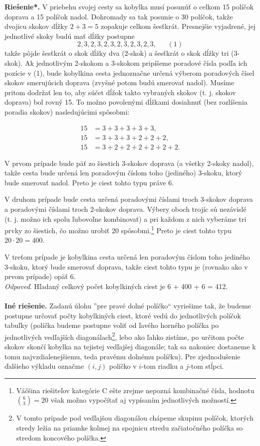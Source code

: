 \documentclass[11pt,a4paper,oneside,final]{book}
\newcommand{\rieh}{\textbf{Riešenie*.} }
\begin{document}
\rieh V priebehu svojej cesty sa kobylka musí posunúť o celkom 15 políčok doprava a 15 políčok nadol. Dohromady sa tak posunie o 30 políčok, takže dvojicu skokov dĺžky $2+3 = 5$ zopakuje celkom šesťkrát. Presnejšie vyjadrené, jej jednotlivé skoky budú mať
dĺžky postupne
$$ 2, 3, 2, 3, 2, 3, 2, 3, 2, 3, 2, 3, \ \ \ \ \ \ \ (1)$$
takže pôjde šesťkrát o skok dĺžky dva (2-skok) a šesťkrát o skok dĺžky tri (3-skok). Ak jednotlivým 2-skokom a 3-skokom pripíšeme poradové čísla podľa ich pozície v (1), bude kobylkina cesta jednoznačne určená výberom poradových čísel skokov smerujúcich doprava (zvyšné potom budú smerovať nadol). Musíme pritom dodržať len to, aby súčet dĺžok takto vybraných skokov (t. j. skokov doprava) bol rovný 15. To možno povolenými dĺžkami dosiahnuť (bez rozlíšenia poradia skokov) nasledujúcimi spôsobmi:
\begin{center}
\begin{align*}
15 &= 3 + 3 + 3 + 3 + 3,\\
15 &= 3 + 3 + 3 + 2 + 2 + 2,\\
15 &= 3 + 2 + 2 + 2 + 2 + 2 + 2.
\end{align*}
\end{center}

V prvom prípade bude päť zo šiestich 3-skokov doprava (a všetky 2-skoky nadol), takže cesta bude určená len poradovým číslom toho (jediného) 3-skoku, ktorý bude smerovať nadol. Preto je ciest tohto typu práve 6.

V druhom prípade bude cesta určená poradovými číslami troch 3-skokov doprava a poradovými číslami troch 2-skokov doprava. Výbery oboch trojíc sú nezávislé (t. j. možno ich spolu ľubovoľne kombinovať) a pri každom z nich vyberáme tri prvky zo šiestich, čo možno urobiť 20 spôsobmi.\footnote{Väčšina riešiteľov kategórie C ešte zrejme nepozná kombinačné čísla, hodnotu $\binom{6}{3}=20$ však možno vypočítať aj vypísaním jednotlivých možností.} Preto je ciest tohto typu $20 \cdot 20 = 400$.

V treťom prípade je kobylkina cesta určená len poradovým číslom toho jediného 3-skoku, ktorý bude smerovať doprava, takže ciest tohto typu je (rovnako ako v prvom prípade) opäť 6.\\
\textit{Odpoveď}. Hľadaný celkový počet kobylkiných ciest je 6 + 400 + 6 = 412.\\
\\
\textbf{Iné riešenie.} Zadanú úlohu ”pre pravé dolné políčko“ vyriešime tak, že budeme postupne určovať počty kobylkiných ciest, ktoré vedú do jednotlivých políčok tabuľky (políčka budeme postupne voliť od ľavého horného políčka po jednotlivých vedľajších diagonálach\footnote{V tomto prípade pod vedľajšou diagonálou chápeme skupinu políčok, ktorých stredy ležia na priamke kolmej na spojnicu stredu začiatočného políčka so stredom koncového políčka.}, lebo ako ľahko zistíme, po určitom počte skokov skončí kobylka na tejistej vedľajšej diagonále; tak sa nakoniec dostaneme k tomu najvzdialenejšiemu, teda pravému dolnému políčku). Pre zjednodušenie ďalšieho výkladu označme $(i, j)$ políčko v $i$-tom riadku a $j$-tom stĺpci.
\end{document}
